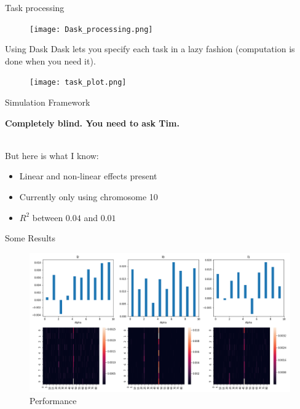 \documentclass{beamer}
\begin{document}
\begin{frame}[t]{Task processing}
  \begin{figure}[htpb]
    \centering
    \texttt{[image: Dask\_processing.png]}
  \end{figure} 
\end{frame}

\begin{frame}[t]{Using Dask}
  Dask lets you specify each task in a lazy fashion (computation is done when you need it).
  \begin{figure}[htpb]
    \centering
    \texttt{[image: task\_plot.png]}
  \end{figure} 
\end{frame}

\begin{frame}[t]{Simulation Framework}
  \begin{center}
  \textbf{Completely blind. You need to ask Tim.}
  \end{center}
  \\
  But here is what I know:
  \begin{itemize}
    \item Linear and non-linear effects present
    \item Currently only using chromosome 10
    \item $R^2$ between $0.04$ and $0.01$
  \end{itemize}
\end{frame}

\begin{frame}[t]{Some Results}
  \begin{figure}[htpb]
    \centering
    \includegraphics[width=0.99\linewidth]{performance.png}
    \caption{Performance}
  \end{figure}
\end{frame}
\end{document}
